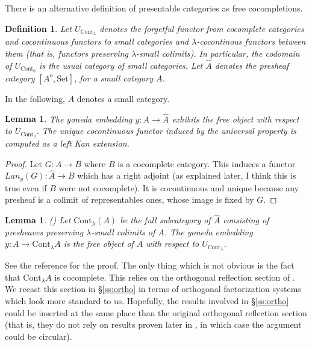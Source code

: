 \documentclass{article}
\newcommand{\Cont}[1]{\text{Cont}_{#1}}
\newcommand{\Set}{\text{Set}}
\newtheorem{definition}[theorem]{Definition}
\newtheorem{lemma}[theorem]{Lemma}
\begin{document}
There is an alternative definition of presentable categories as free cocompletions.
\begin{definition}
 Let $U_{\Cont\lambda}$ denotes the forgetful functor from cocomplete categories
 and cocontinuous functors
 to small categories and $\lambda$-cocontinous functors between them (that is,
 functors preserving $\lambda$-small colimits).  In particular, the codomain of $U_{\Cont{0}}$
 is the usual category of small categories.
 Let $\hat{A}$ denotes the presheaf category $[A^o, \Set]$, for a small category $A$.
\end{definition}
In the following, $A$ denotes a small category.
\begin{lemma} The yoneda embedding
$y:A \rightarrow \hat{A}$ exhibits the free object with respect to
$U_{\Cont{0}}$.
The unique cocontinuous functor induced by the universal property is computed as a left Kan
extension.
\label{l:free-cocomp}
  \end{lemma}
  \begin{proof}
    Let $G:A \rightarrow B$ where $B$ is a cocomplete category.
    This induces a functor $Lan_y(G) : \hat{A} \rightarrow B$ which has a right
    adjoint (as explained later, I think this is true even if $B$ were not cocomplete). It is
    cocontinuous and unique because any presheaf is a colimit of representables ones, whose
    image is fixed by $G$.
  \end{proof}
  \begin{lemma}
    \label{l:cont-free}
    (\cite[Proposition 1.45]{adamek_rosicky})
    Let $\Cont\lambda(A)$ be the full subcategory of $\hat{A}$ consisting of
presheaves preserving $\lambda$-small colimits of $A$.
    The yoneda embedding
    $y:A \rightarrow \Cont\lambda{A}$ is the free object of $A$ with respect to $U_{\Cont{\lambda}}$.
  \end{lemma}
   See the reference for the proof. The only thing which is not obvious is the
   fact that $\Cont\lambda{A}$ is cocomplete. This relies on the orthogonal
   reflection section of \cite{adamek_rosicky}.
   We recast this section in \S\ref{ss:ortho} in terms of orthogonal
   factorization systems which look more standard to us. Hopefully, the results
   involved in \S\ref{ss:ortho} could be inserted at the same place than the original
   orthogonal reflection section (that is, they do not rely on results proven
   later in \cite{adamek_rosicky}, in which case the argument could be circular).
\end{document}

